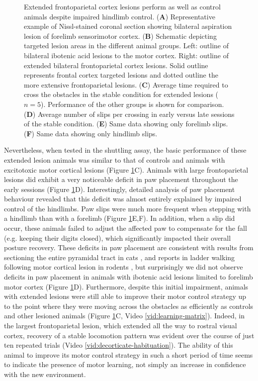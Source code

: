 \begin{figure}
\centering

\caption{Extended frontoparietal cortex lesions perform as well as control animals despite impaired hindlimb control. (\textbf{A}) Representative example of Nissl-stained coronal section showing bilateral aspiration lesion of forelimb sensorimotor cortex. (\textbf{B}) Schematic depicting targeted lesion areas in the different animal groups. Left: outline of bilateral ibotenic acid lesions to the motor cortex. Right: outline of extended bilateral frontoparietal cortex lesions. Solid outline represents frontal cortex targeted lesions and dotted outline the more extensive frontoparietal lesions. (\textbf{C}) Average time required to cross the obstacles in the stable condition for extended lesions ($n = 5$). Performance of the other groups is shown for comparison. (\textbf{D}) Average number of slips per crossing in early versus late sessions of the stable condition. (\textbf{E}) Same data showing only forelimb slips. (\textbf{F}) Same data showing only hindlimb slips.}
\label{fig:extended}
\end{figure}

Nevertheless, when tested in the shuttling assay, the basic performance of these extended lesion animals was similar to that of controls and animals with excitotoxic motor cortical lesions (Figure \ref{fig:extended}C). Animals with large frontoparietal lesions did exhibit a very noticeable deficit in paw placement throughout the early sessions (Figure \ref{fig:extended}D). Interestingly, detailed analysis of paw placement behaviour revealed that this deficit was almost entirely explained by impaired control of the hindlimbs. Paw slips were much more frequent when stepping with a hindlimb than with a forelimb (Figure \ref{fig:extended}E,F). In addition, when a slip did occur, these animals failed to adjust the affected paw to compensate for the fall (e.g. keeping their digits closed), which significantly impacted their overall posture recovery. These deficits in paw placement are consistent with results from sectioning the entire pyramidal tract in cats \cite{Liddell1944}, and reports in ladder walking following motor cortical lesion in rodents \cite{Metz2002}, but surprisingly we did not observe deficits in paw placement in animals with ibotenic acid lesions limited to forelimb motor cortex (Figure \ref{fig:extended}D). Furthermore, despite this initial impairment, animals with extended lesions were still able to improve their motor control strategy up to the point where they were moving across the obstacles as efficiently as controls and other lesioned animals (Figure \ref{fig:extended}C, Video \ref{vid:learning-matrix}). Indeed, in the largest frontoparietal lesion, which extended all the way to rostral visual cortex, recovery of a stable locomotion pattern was evident over the course of just ten repeated trials (Video \ref{vid:decorticate-habituation}). The ability of this animal to improve its motor control strategy in such a short period of time seems to indicate the presence of motor learning, not simply an increase in confidence with the new environment.

